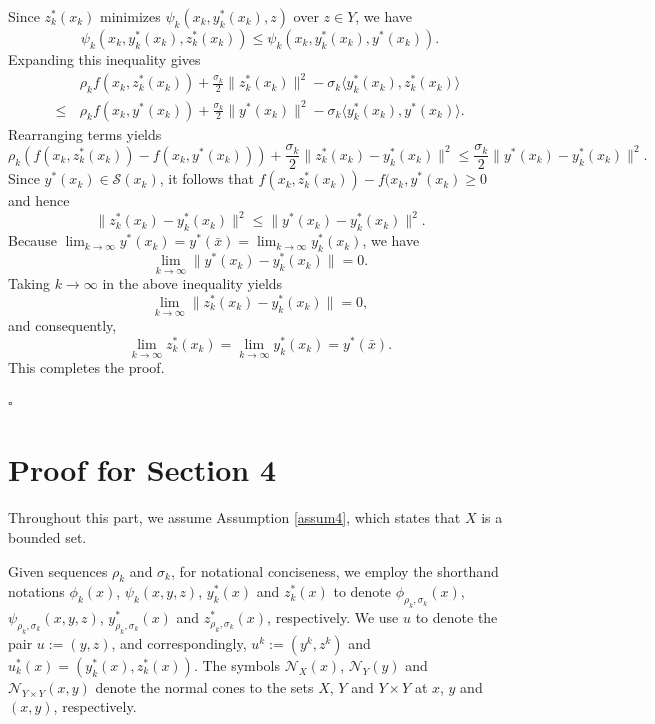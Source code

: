 \documentclass{article}
\newenvironment{proof}[1][Proof]{\par
	\normalfont\topsep6pt\relax
	\trivlist\item[\hskip\labelsep\itshape #1.]\ignorespaces
}{%
	\hfill\ensuremath{\square}\endtrivlist
}
\begin{document}
\begin{proof}[Proof for Theorem \ref{lim_yz}]
Since $z_k^*(x_k)$ minimizes $\psi_{k}(x_k, y_k^*(x_k), z)$ over $z \in Y$, we have
    \[
    \psi_k (x_k,y_k^*(x_k), z_k^*(x_k)) \le \psi_k (x_k,y_k^*(x_k), y^*(x_k)).
    \]
Expanding this inequality gives
\[
\begin{aligned}
     &\rho_k f(x_k, z_k^*(x_k) ) + \frac{\sigma_k}{2}\| z_k^*(x_k) \|^2 - \sigma_k \langle y_k^*(x_k) , z_k^*(x_k) \rangle \\
     \le \, &\rho_k f(x_k, y^*(x_k) )+ \frac{\sigma_k}{2}\| y^*(x_k)\|^2 - \sigma_k \langle y_k^*(x_k) ,y^*(x_k) \rangle .
\end{aligned}
\]
Rearranging terms yields  
\[
    \rho_k \left( f(x_k, z_k^*(x_k) )  - f(x_k, y^*(x_k) ) \right) + \frac{\sigma_k}{2}\|z_k^*(x_k) - y_k^*(x_k)\|^2 \le \frac{\sigma_k}{2}\| y^*(x_k) - y_k^*(x_k) \|^2.
\]
Since $y^*(x_k) \in \mathcal{S}(x_k)$, it follows that $f(x_k, z_k^*(x_k) )  - f(x_k, y^*(x_k) \ge 0$ and hence
\[
\|z_k^*(x_k) - y_k^*(x_k)\|^2 \le \| y^*(x_k) - y_k^*(x_k) \|^2.
\]
Because $\lim_{k \to\infty}y^*(x_k)=y^*(\bar{x}) = \lim_{k \to\infty}y_k^*(x_k)$, we have 
\[
\lim_{k \to\infty} \| y^*(x_k) - y_k^*(x_k) \| = 0.
\]
Taking $k \rightarrow \infty$ in the above inequality yields  
\[
\lim_{k \to\infty}  \|z_k^*(x_k) - y_k^*(x_k)\| =0,
\]
and consequently,
\[
\lim_{k \to\infty}z_k^*(x_k) = \lim_{k \to\infty}y_k^*(x_k) = y^*(\bar{x}).
\]
This completes the proof.
        

\end{proof}




\section{Proof for Section 4}\label{append:convergence}

Throughout this part, we assume Assumption \ref{assum4}, which states that $X$ is a bounded set. 

Given sequences $\rho_k$ and $\sigma_k$, for notational conciseness, we employ the shorthand notations $\phi_k(x)$, $\psi_k(x,y,z)$, $y^*_k(x)$ and $z^*_k(x)$ to denote $\phi_{\rho_k,\sigma_k}(x)$, $\psi_{\rho_k,\sigma_k}(x,y,z)$, $y^*_{\rho_k,\sigma_k}(x)$ and $z^*_{\rho_k,\sigma_k}(x)$, respectively. We use $u$ to denote the pair $u:=(y,z)$, and correspondingly, $u^k:=(y^k,z^k)$ and $u^*_k(x) = (y^*_k(x), z^*_k(x))$.
The symbols  $\mathcal{N}_X(x)$, $\mathcal{N}_Y(y)$ and $\mathcal{N}_{Y \times Y}(x,y)$ denote the normal cones to the sets $X$, $Y$ and $Y \times Y$ at $x$, $y$ and $(x,y)$, respectively.
\end{document}
